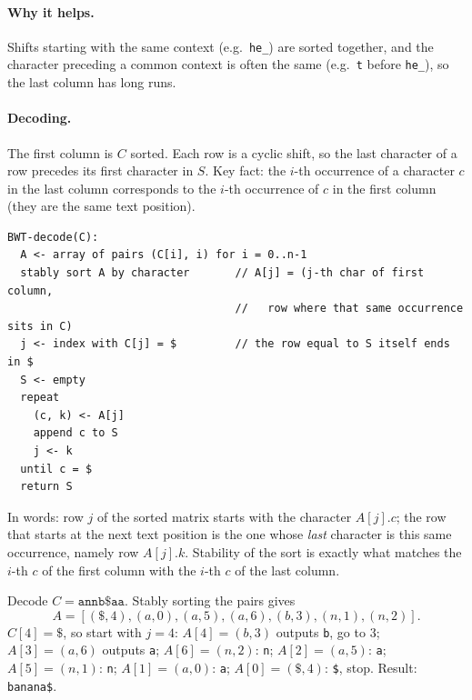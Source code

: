 \paragraph{Why it helps.} Shifts starting with the same context (e.g.\
\texttt{he\_}) are sorted together, and the character preceding a common context
is often the same (e.g.\ \texttt{t} before \texttt{he\_}), so the last column
has long runs.

\paragraph{Decoding.} The first column is $C$ sorted. Each row is a cyclic shift,
so the last character of a row precedes its first character in $S$. Key fact:
the $i$-th occurrence of a character $c$ in the last column corresponds to the
$i$-th occurrence of $c$ in the first column (they are the same text position).
\begin{lstlisting}
BWT-decode(C):
  A <- array of pairs (C[i], i) for i = 0..n-1
  stably sort A by character       // A[j] = (j-th char of first column,
                                   //   row where that same occurrence sits in C)
  j <- index with C[j] = $         // the row equal to S itself ends in $
  S <- empty
  repeat
    (c, k) <- A[j]
    append c to S
    j <- k
  until c = $
  return S
\end{lstlisting}
In words: row $j$ of the sorted matrix starts with the character $A[j].c$; the
row that starts at the next text position is the one whose \emph{last} character
is this same occurrence, namely row $A[j].k$. Stability of the sort is exactly
what matches the $i$-th $c$ of the first column with the $i$-th $c$ of the last
column.

\begin{example}
Decode $C = \texttt{annb\$aa}$. Stably sorting the pairs gives
\[
A = [(\$,4), (a,0), (a,5), (a,6), (b,3), (n,1), (n,2)].
\]
$C[4] = \$$, so start with $j = 4$: $A[4] = (b,3)$ outputs \texttt{b}, go to 3;
$A[3] = (a,6)$ outputs \texttt{a}; $A[6] = (n,2)$: \texttt{n}; $A[2] = (a,5)$:
\texttt{a}; $A[5] = (n,1)$: \texttt{n}; $A[1] = (a,0)$: \texttt{a};
$A[0] = (\$,4)$: \texttt{\$}, stop. Result: \texttt{banana\$}.
\end{example}

